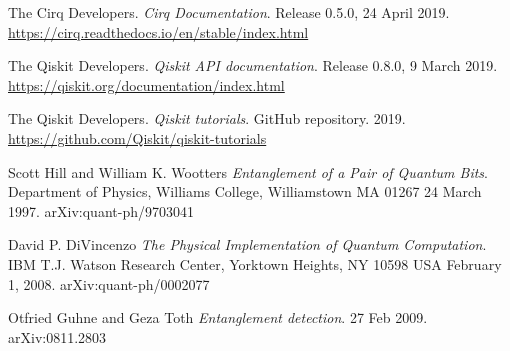 \documentclass[11pt, a4paper, twoside, openright]{book}
\renewcommand{\'}[0]{\`}
\theoremstyle{definition}
\begin{document}
\begin{thebibliography}{99}
The Cirq Developers.
\textit{Cirq Documentation}.
Release 0.5.0, 24 April 2019.
\url{https://cirq.readthedocs.io/en/stable/index.html}

The Qiskit Developers.
\textit{Qiskit API documentation}.
Release 0.8.0, 9 March 2019.
\url{https://qiskit.org/documentation/index.html}

The Qiskit Developers.
\textit{Qiskit tutorials}.
GitHub repository.
2019.
\url{https://github.com/Qiskit/qiskit-tutorials}

Scott Hill and William K. Wootters
\textit{Entanglement of a Pair of Quantum Bits}.
Department of Physics, Williams College, Williamstown MA 01267
24 March 1997.  
arXiv:quant-ph/9703041

David P. DiVincenzo
\textit{The Physical Implementation of Quantum Computation}.
IBM T.J. Watson Research Center, Yorktown Heights, NY 10598 USA
February 1, 2008.
arXiv:quant-ph/0002077

Otfried Guhne and Geza Toth
\textit{Entanglement detection}.
27 Feb 2009.
arXiv:0811.2803 

\end{thebibliography}
\end{document}
